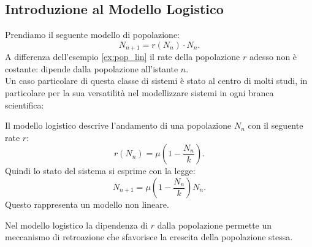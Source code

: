 \subsection{Introduzione al Modello Logistico}%
\label{sub:Introduzione al Modello Logistico}
Prendiamo il seguente modello di popolazione:
\[
    N_{n+1} = r(N_n)\cdot N_n
.\] 
A differenza dell'esempio \ref{ex:pop_lin} il rate della popolazione $r$ adesso non è costante: dipende dalla popolazione all'istante $n$.\\
Un caso particolare di questa classe di sistemi è stato al centro di molti studi, in particolare per la sua versatilità nel modellizzare sistemi in ogni branca scientifica:
\begin{defn}
    Il modello logistico descrive l'andamento di una popolazione $N_n$ con il seguente rate $r$:
    \[
	r(N_n) = \mu\left(1-\frac{N_n}{k}\right) 
    .\] 
    Quindi lo stato del sistema si esprime con la legge:
    \[
        N_{n+1} = \mu\left(1-\frac{N_n}{k}\right)N_n
    .\] 
    Questo rappresenta un modello non lineare.
\end{defn}
\noindent
Nel modello logistico la dipendenza di $r$ dalla popolazione permette un meccanismo di retroazione che sfavorisce la crescita della popolazione stessa.

